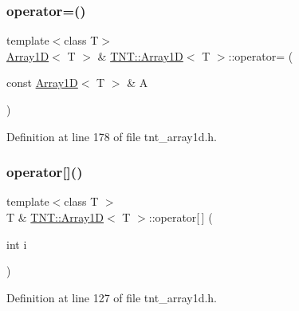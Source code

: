 \subsubsection{\texorpdfstring{operator=()}{operator=()}\hspace{0.1cm}{\footnotesize\ttfamily [2/2]}}
{\footnotesize\ttfamily template$<$class T$>$ \\
\hyperlink{classTNT_1_1Array1D}{Array1D}$<$ T $>$ \& \hyperlink{classTNT_1_1Array1D}{T\+N\+T\+::\+Array1D}$<$ T $>$\+::operator= (\begin{DoxyParamCaption}\item[{const \hyperlink{classTNT_1_1Array1D}{Array1D}$<$ T $>$ \&}]{A }\end{DoxyParamCaption})\hspace{0.3cm}{\ttfamily [inline]}}



Definition at line 178 of file tnt\+\_\+array1d.\+h.

\mbox{\label{classTNT_1_1Array1D_a16850fa648cd1bf8144df68e1418b3ee}} 
\subsubsection{\texorpdfstring{operator[]()}{operator[]()}\hspace{0.1cm}{\footnotesize\ttfamily [1/2]}}
{\footnotesize\ttfamily template$<$class T $>$ \\
T \& \hyperlink{classTNT_1_1Array1D}{T\+N\+T\+::\+Array1D}$<$ T $>$\+::operator\mbox{[}$\,$\mbox{]} (\begin{DoxyParamCaption}\item[{int}]{i }\end{DoxyParamCaption})\hspace{0.3cm}{\ttfamily [inline]}}



Definition at line 127 of file tnt\+\_\+array1d.\+h.

\mbox{\label{classTNT_1_1Array1D_a774027e05012d66f5cd9d2aae57d7ab4}} 
